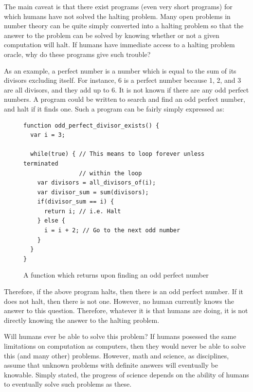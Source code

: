 The main caveat is that there exist programs (even very short programs) for which humans have not solved the halting problem.  Many open problems in number theory can be quite simply converted into a halting problem so that the answer to the problem can be solved by knowing whether or not a given computation will halt.  If humans have immediate access to a halting problem oracle, why do these programs give such trouble?

As an example, a perfect number is a number which is equal to the sum of its divisors excluding itself.  For instance, 6 is a perfect number because 1, 2, and 3 are all divisors, and they add up to 6.  It is not known if there are any odd perfect numbers.  A program could be written to search and find an odd perfect number, and halt if it finds one.  Such a program can be fairly simply expressed as:

\begin{figure}[H]
\begin{mdframed}
\begin{verbatim}
function odd_perfect_divisor_exists() {
  var i = 3;

  while(true) { // This means to loop forever unless terminated 
                // within the loop
    var divisors = all_divisors_of(i);
    var divisor_sum = sum(divisors);
    if(divisor_sum == i) {
      return i; // i.e. Halt
    } else {
      i = i + 2; // Go to the next odd number
    }
  }
}
\end{verbatim}
\end{mdframed}
\caption{A function which returns upon finding an odd perfect number}
\end{figure}

Therefore, if the above program halts, then there is an odd perfect number.  If it does not halt, then there is not one.  However, no human currently knows the answer to this question.  Therefore, whatever it is that humans are doing, it is not directly knowing the answer to the halting problem.

Will humans ever be able to solve this problem?  If humans posessed the same limitations on computation as computers, then they would never be able to solve this (and many other) problems.  However, math and science, as disciplines, assume that unknown problems with definite answers will eventually be knowable.  Simply stated, the progress of science depends on the ability of humans to eventually solve such problems as these.


